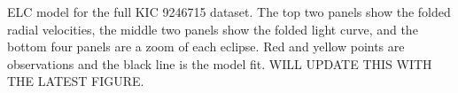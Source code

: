 \label{fig:ELCresult} ELC model for the full KIC 9246715 dataset. The top two panels show the folded radial velocities, the middle two panels show the folded light curve, and the bottom four panels are a zoom of each eclipse. Red and yellow points are observations and the black line is the model fit. WILL UPDATE THIS WITH THE LATEST FIGURE.